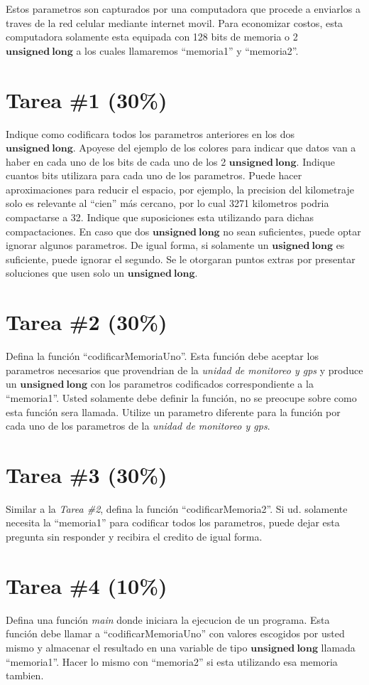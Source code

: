 \documentclass{article}
\begin{document}
Estos parametros son capturados por una computadora que procede a enviarlos a traves de la red celular
mediante internet movil. Para economizar costos, esta computadora solamente esta equipada con
128 bits de memoria o 2 $\mathbf{unsigned\ long}$ a los cuales llamaremos ``memoria1'' y ``memoria2''.

\section*{Tarea \#1 (30\%)}

Indique como codificara todos los parametros anteriores en los dos $\mathbf{unsigned\ long}$. Apoyese
del ejemplo de los colores para indicar que datos van a haber en cada uno de los bits de cada uno de
los 2 $\mathbf{unsigned\ long}$. Indique cuantos bits utilizara para cada uno de los parametros. Puede
hacer aproximaciones para reducir el espacio, por ejemplo, la precision del kilometraje solo es relevante
al ``cien'' m\'as cercano, por lo cual 3271 kilometros podria compactarse a 32. Indique que suposiciones
esta utilizando para dichas compactaciones. En caso que dos $\mathbf{unsigned\ long}$ no sean suficientes,
puede optar ignorar algunos parametros. De igual forma, si solamente un $\mathbf{usigned\ long}$ es
suficiente, puede ignorar el segundo. Se le otorgaran puntos extras por presentar soluciones que usen
solo un $\mathbf{unsigned\ long}$.

\section*{Tarea \#2 (30\%)}

Defina la funci\'on ``codificarMemoriaUno''. Esta funci\'on debe aceptar los parametros necesarios
que provendrian de la \emph{unidad de monitoreo y gps} y produce un $\mathbf{unsigned\ long}$ con
los parametros codificados correspondiente a la ``memoria1''. Usted solamente debe definir la funci\'on,
no se preocupe sobre como esta funci\'on sera llamada. Utilize un parametro diferente para la funci\'on
por cada uno de los parametros de la \emph{unidad de monitoreo y gps}.

\section*{Tarea \#3 (30\%)}

Similar a la \emph{Tarea \#2}, defina la funci\'on ``codificarMemoria2''. Si ud. solamente necesita
la ``memoria1'' para codificar todos los parametros, puede dejar esta pregunta sin responder y
recibira el credito de igual forma.

\section*{Tarea \#4 (10\%)}

Defina una funci\'on \emph{main} donde iniciara la ejecucion de un programa. Esta funci\'on debe
llamar a ``codificarMemoriaUno'' con valores escogidos por usted mismo y almacenar el resultado
en una variable de tipo $\mathbf{unsigned\ long}$ llamada ``memoria1''. Hacer lo mismo con
``memoria2'' si esta utilizando esa memoria tambien.
\end{document}
